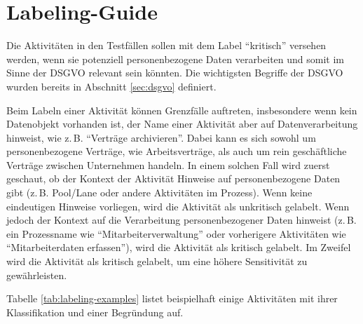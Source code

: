 \section{Labeling-Guide}\label{sec:labeling-guide}

Die Aktivitäten in den Testfällen sollen mit dem Label \enquote{kritisch} versehen werden, wenn sie potenziell personenbezogene Daten verarbeiten und somit im Sinne der \ac{DSGVO} relevant sein könnten. Die wichtigsten Begriffe der \ac{DSGVO} wurden bereits in Abschnitt \ref{sec:dsgvo} definiert.

Beim Labeln einer Aktivität können Grenzfälle auftreten, insbesondere wenn kein Datenobjekt vorhanden ist, der Name einer Aktivität aber auf Datenverarbeitung hinweist, wie z.\,B. \enquote{Verträge archivieren}. Dabei kann es sich sowohl um personenbezogene Verträge, wie Arbeitsverträge, als auch um rein geschäftliche Verträge zwischen Unternehmen handeln. In einem solchen Fall wird zuerst geschaut, ob der Kontext der Aktivität Hinweise auf personenbezogene Daten gibt (z.\,B. Pool/Lane oder andere Aktivitäten im Prozess). Wenn keine eindeutigen Hinweise vorliegen, wird die Aktivität als unkritisch gelabelt. Wenn jedoch der Kontext auf die Verarbeitung personenbezogener Daten hinweist (z.\,B. ein Prozessname wie \enquote{Mitarbeiterverwaltung} oder vorherigere Aktivitäten wie \enquote{Mitarbeiterdaten erfassen}), wird die Aktivität als kritisch gelabelt. Im Zweifel wird die Aktivität als kritisch gelabelt, um eine höhere Sensitivität zu gewährleisten.

Tabelle \ref{tab:labeling-examples} listet beispielhaft einige Aktivitäten mit ihrer Klassifikation und einer Begründung auf.

